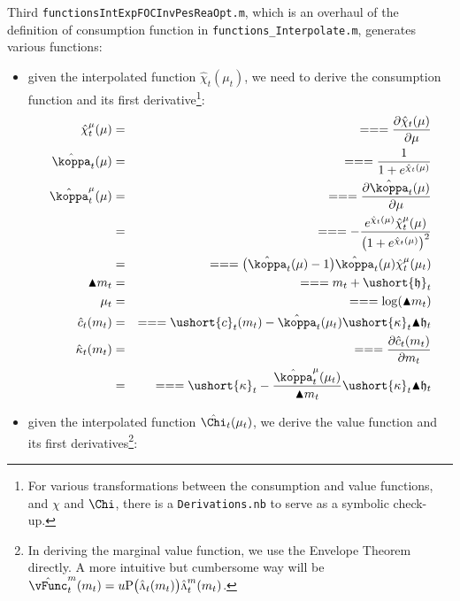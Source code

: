 \documentclass[titlepage,abstract]{\econtex}
\providecommand{\vInv}{\ensuremath{\scriptstyle \Lambda \displaystyle}}
\begin{document}
Third \texttt{functionsIntExpFOCInvPesReaOpt.m}, which is an overhaul of the definition of consumption function in \texttt{functions\_Interpolate.m}, generates various functions:
\begin{itemize}
        \item given the interpolated function $\hat{\chi}_{t}(\mu_{t})$, we need to derive the consumption function and its first derivative\footnote{For various transformations between the consumption and value functions, and $\chi$ and $\Chi$, there is a \texttt{Derivations.nb} to serve as a symbolic check-up.}:
            \begin{equation}\begin{gathered}\begin{aligned}
            \hat{\chi}^{\mu}_{t}(\mu)    &=& =  =  =  \frac{\partial \hat{\chi}_{t}(\mu)}{\partial \mu} \\
            \hat{\koppa}_{t} (\mu)    &=& =  =  = \frac{1}{1+e^{\hat{\chi}_{t}(\mu)}} \\
            \hat{\koppa}^{\mu}_{t} (\mu)    &=& =  =  =  \frac{\partial \hat{\koppa}_{t} (\mu)}{\partial \mu} \\
               &=& =  =  =  -\frac{e^{\hat{\chi}_{t}(\mu)} \hat{\chi}^{\mu}_{t}(\mu)}{\big(1+e^{\hat{\chi}_{t}(\mu)}\big)^{2}} \\
               &=& =  =  =  \big(\hat{\koppa}_{t} (\mu)-1\big)\hat{\koppa}_{t} (\mu) \hat{\chi}^{\mu}_{t}(\mu_{t}) \\
            \blacktriangle m_{t}    &=& =  =  =  m_{t} + \ushort{\mathfrak{h}}_{t} \\
            \mu_{t}    &=& =  =  =  \log(\blacktriangle m_{t}) \\
            \hat{c}_{t}(m_{t})    &=& =  =  =  \ushort{c}_{t}(m_{t})-\hat{\koppa}_{t}(\mu_{t}) \ushort{\kappa}_{t} \blacktriangle \mathfrak{h}_{t} \\
            \hat{\kappa}_{t}(m_{t})    &=& =  =  =  \frac{\partial \hat{c}_{t}(m_{t})}{\partial m_{t}} \\
               &=& =  =  =  \ushort{\kappa}_{t}-\frac{\hat{\koppa}^{\mu}_{t}(\mu_{t})}{\blacktriangle m_{t}} \ushort{\kappa}_{t} \blacktriangle \mathfrak{h}_{t} \\
            \end{aligned}\end{gathered}\end{equation}
        \item given the interpolated function $\hat{\Chi}_{t}(\mu_{t})$, we derive the value function and its first derivatives\footnote{In deriving the marginal value function, we use the Envelope Theorem directly. A more intuitive but cumbersome way will be $\hat{\vFunc}_{t}^{m} (m_{t}) = u\text{P}\big(\hat{\vInv}_{t}(m_{t})\big) \hat{\vInv}_{t}^{m} (m_{t})$.}:

\end{itemize}
\end{document}
